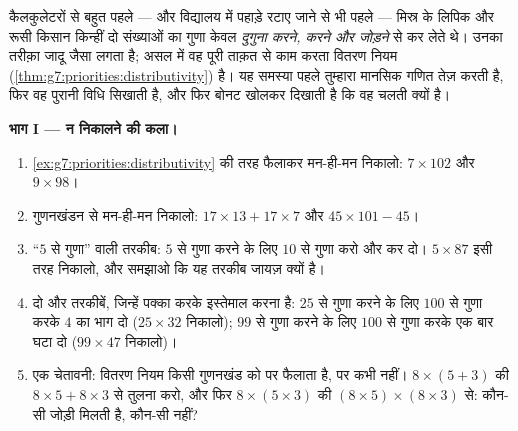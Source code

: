 \begin{problem}
\label{pb:g7:priorities:1}
कैलकुलेटरों से बहुत पहले --- और विद्यालय में पहाड़े रटाए जाने से
भी पहले --- मिस्र के लिपिक और रूसी किसान किन्हीं दो संख्याओं का
गुणा केवल \emph{दुगुना करने,  करने और जोड़ने} से कर लेते थे।
उनका तरीक़ा जादू जैसा लगता है; असल में वह पूरी ताक़त से काम करता
वितरण नियम (\cref{thm:g7:priorities:distributivity}) है। यह
समस्या पहले तुम्हारा मानसिक गणित तेज़ करती है, फिर वह पुरानी
विधि सिखाती है, और फिर बोनट खोलकर दिखाती है कि वह चलती क्यों है।

\medskip
\noindent\textbf{भाग I --- न निकालने की कला।}
\begin{enumerate}
  \item \cref{ex:g7:priorities:distributivity} की तरह फैलाकर
        मन-ही-मन निकालो:
        $7 \times 102$ और $9 \times 98$।
  \item गुणनखंडन से मन-ही-मन निकालो:
        $17 \times 13 + 17 \times 7$ और
        $45 \times 101 - 45$।
  \item ``$5$ से गुणा'' वाली तरकीब: $5$ से गुणा करने के लिए $10$
        से गुणा करो और  कर दो। $5 \times 87$ इसी तरह निकालो,
        और समझाओ कि यह तरकीब जायज़ क्यों है।
  \item दो और तरकीबें, जिन्हें पक्का करके इस्तेमाल करना है:
        $25$ से गुणा करने के लिए $100$ से गुणा करके $4$ का भाग
        दो ($25 \times 32$ निकालो); $99$ से गुणा करने के लिए
        $100$ से गुणा करके एक बार घटा दो ($99 \times 47$ निकालो)।
  \item एक चेतावनी: वितरण नियम किसी गुणनखंड को \emph{} पर
        फैलाता है,  पर कभी नहीं।
        $8 \times (5 + 3)$ की $8 \times 5 + 8 \times 3$ से तुलना
        करो, और फिर $8 \times (5 \times 3)$ की
        $(8 \times 5) \times (8 \times 3)$ से: कौन-सी जोड़ी मिलती
        है, कौन-सी नहीं?
\end{enumerate}


\end{problem}
